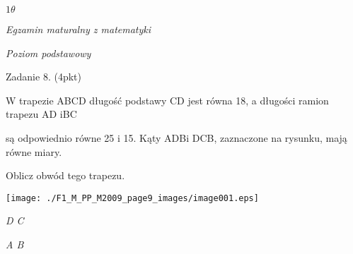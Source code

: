 \documentclass[a4paper,12pt]{article}
\begin{document}
$ 1\theta$

{\it Egzamin maturalny z matematyki}

{\it Poziom podstawowy}

Zadanie 8. (4pkt)

W trapezie ABCD długość podstawy CD jest równa 18, a długości ramion trapezu AD iBC

są odpowiednio równe 25 i 15. Kąty ADBi DCB, zaznaczone na rysunku, mają równe miary.

Oblicz obwód tego trapezu.
\begin{center}
\texttt{[image: ./F1\_M\_PP\_M2009\_page9\_images/image001.eps]}
\end{center}
{\it D  C}

{\it A  B}
\end{document}
